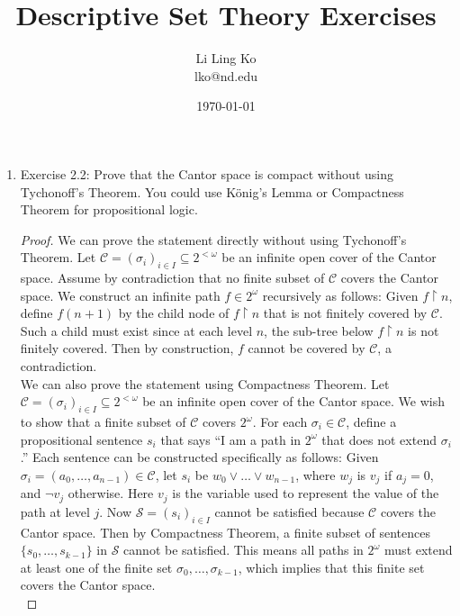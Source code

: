 \documentclass{article}
\begin{document}
\title{Descriptive Set Theory Exercises}
\author{Li Ling Ko\\ lko@nd.edu}
\date{\today}
\maketitle

\begin{enumerate}
  \item Exercise 2.2: Prove that the Cantor space is compact without using
    Tychonoff's Theorem. You could use K\"{o}nig's Lemma or Compactness Theorem
    for propositional logic.
    \begin{proof}
      We can prove the statement directly without using Tychonoff's
      Theorem. Let $\mathcal{C}=(\sigma_i)_{i\in I}\subseteq 2^{<\omega}$
      be an infinite open cover of the Cantor space. Assume by
      contradiction that no finite subset of $\mathcal{C}$ covers the
      Cantor space. We construct an infinite path $f\in 2^\omega$
      recursively as follows: Given $f\upharpoonright n$, define $f(n+1)$
      by the child node of $f\upharpoonright n$ that is not finitely
      covered by $\mathcal{C}$.  Such a child must exist since at each
      level $n$, the sub-tree below $f\upharpoonright n$ is not finitely
      covered. Then by construction, $f$ cannot be covered by
      $\mathcal{C}$, a contradiction. \\

      We can also prove the statement using Compactness Theorem. Let
      $\mathcal{C}=(\sigma_i)_{i\in I}\subseteq 2^{<\omega}$ be an infinite
      open cover of the Cantor space. We wish to show that a finite subset
      of $\mathcal{C}$ covers $2^{\omega}$. For each
      $\sigma_i\in\mathcal{C}$, define a propositional sentence $s_i$ that
      says ``I am a path in $2^\omega$ that does not extend $\sigma_i$.''
      Each sentence can be constructed specifically as follows: Given
      $\sigma_i=(a_0,\ldots,a_{n-1})\in\mathcal{C}$, let $s_i$ be
      $w_0\vee\ldots\vee w_{n-1}$, where $w_j$ is $v_j$ if $a_j=0$, and
      $\neg v_j$ otherwise. Here $v_j$ is the variable used to represent
      the value of the path at level $j$. Now $\mathcal{S}=(s_i)_{i\in
      I}$ cannot be satisfied because $\mathcal{C}$ covers the Cantor
      space. Then by Compactness Theorem, a finite subset of sentences
      $\{s_0,\ldots,s_{k-1}\}$ in $\mathcal{S}$ cannot be satisfied. This
      means all paths in $2^\omega$ must extend at least one of the finite
      set $\sigma_0,\ldots,\sigma_{k-1}$, which implies that this finite set
      covers the Cantor space. \\


\end{proof}
\end{enumerate}
\end{document}
